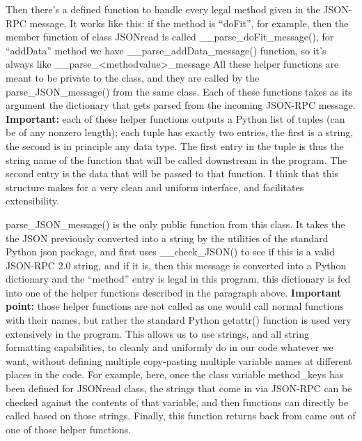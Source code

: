 \documentclass[11pt]{article} %
\begin{document}
Then there's a defined function to handle every legal method given in the JSON-RPC message. It works like this: if the method is ``doFit'', for example, then the member function of class { JSONread} is called { \_\_parse\_doFit\_message()}, for ``addData'' method we have { \_\_parse\_addData\_message()} function, so it's always like { \_\_parse\_<methodvalue>\_message} All these helper functions are meant to be private to the class, and they are called by the { parse\_JSON\_message()} from the same class. Each of these functions takes as its argument the dictionary that gets parsed from the incoming JSON-RPC message. \textbf{Important:} each of these helper functions outputs a Python list of tuples (can be of any nonzero length); each tuple has exactly two entries, the first is a string, the second is in principle any data type. The first entry in the tuple is thus the string name of the function that will be called downstream in the program. The second entry is the data that will be passed to that function. I think that this structure makes for a very clean and uniform interface, and facilitates extensibility. 

{ parse\_JSON\_message()} is the only public function from this class. It takes the the JSON previously converted into a string by the utilities of the standard Python { json} package, and first uses { \_\_check\_JSON()} to see if this is a valid JSON-RPC 2.0 string, and if it is, then this message is converted into a Python dictionary and the ``method'' entry is legal in this program, this dictionary is fed into one of the helper functions described in the paragraph above. \textbf{Important point:} those helper functions are not called as one would call normal functions with their names, but rather the standard Python { getattr()} function is used very extensively in the program. This allows us to use strings, and all string formatting capabilities, to cleanly and uniformly do in our code whatever we want, without defining multiple copy-pasting multiple variable names at different places in the code. For example, here, once the class variable { method\_keys} has been defined for { JSONread} class, the strings that come in via JSON-RPC can be checked against the contents of that variable, and then functions can directly be called based on those strings. Finally, this function returns back from came out of one of those helper functions. 
\end{document}
